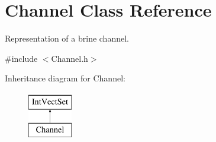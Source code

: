 \hypertarget{class_channel}{}\section{Channel Class Reference}
\label{class_channel}


Representation of a brine channel.  




{\ttfamily \#include $<$Channel.\+h$>$}

Inheritance diagram for Channel\+:\begin{figure}[H]
\begin{center}
\leavevmode
\includegraphics[height=2.000000cm]{class_channel}
\end{center}
\end{figure}
